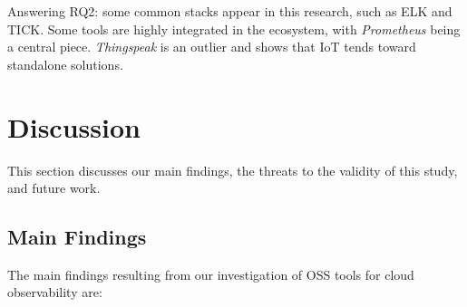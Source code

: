 \documentclass[sigconf]{acmart}
\begin{document}
\begin{framed}
Answering RQ2: some common stacks appear in this research, such as ELK
and TICK. Some tools are highly integrated in the ecosystem, with
\emph{Prometheus} being a central piece. \emph{Thingspeak} is an outlier
and shows that IoT tends toward standalone solutions.
\end{framed}

\section{Discussion}\label{discussion}

This section discusses our main findings, the threats to the validity of
this study, and future work.

\subsection{Main Findings}\label{main-findings}

The main findings resulting from our investigation of OSS tools for
cloud observability are:
\end{document}
